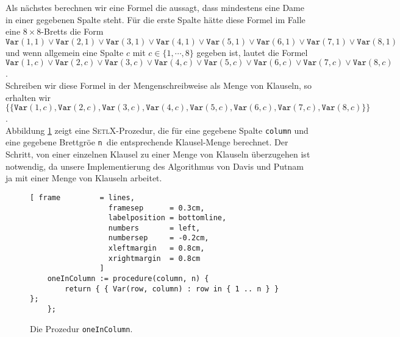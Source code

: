 Als n\"{a}chstes berechnen wir eine Formel die aussagt, dass mindestens eine Dame in einer gegebenen
Spalte steht.  F\"{u}r die erste Spalte h\"{a}tte diese Formel im Falle eine $8 \times 8$-Bretts die Form 
\\[0.2cm]
\hspace*{1.3cm}
$\texttt{Var}(1,1) \vee \texttt{Var}(2,1) \vee \texttt{Var}(3,1) \vee \texttt{Var}(4,1) \vee \texttt{Var}(5,1) \vee
\texttt{Var}(6,1) \vee \texttt{Var}(7,1) \vee \texttt{Var}(8,1)$
\\[0.2cm]
und wenn allgemein eine Spalte $c$ mit $c \in \{1,\cdots,8\}$ gegeben ist, lautet die Formel
\\[0.2cm]
\hspace*{1.3cm}
$\texttt{Var}(1,c) \vee \texttt{Var}(2,c) \vee \texttt{Var}(3,c) \vee \texttt{Var}(4,c) \vee \texttt{Var}(5,c) \vee
\texttt{Var}(6,c) \vee \texttt{Var}(7,c) \vee \texttt{Var}(8,c)$.
\\[0.2cm]
Schreiben wir diese Formel in der Mengenschreibweise als Menge von Klauseln, so erhalten wir
\\[0.2cm]
\hspace*{1.3cm}
$\bigl\{ \{\texttt{Var}(1,c) , \texttt{Var}(2,c) , \texttt{Var}(3,c) , \texttt{Var}(4,c) , \texttt{Var}(5,c) ,
\texttt{Var}(6,c) , \texttt{Var}(7,c) , \texttt{Var}(8,c) \}\bigr\}$.
\\[0.2cm]
Abbildung \ref{fig:oneInColumn} zeigt eine \textsc{SetlX}-Prozedur, die f\"{u}r eine gegebene Spalte
\texttt{column} und eine gegebene Brettgr\"{o}\3e \texttt{n }die entsprechende Klausel-Menge berechnet.
Der Schritt, von einer einzelnen Klausel 
zu einer Menge von Klauseln \"{u}berzugehen ist notwendig, da unsere Implementierung des Algorithmus von
Davis und Putnam ja mit einer Menge von Klauseln arbeitet.

\begin{figure}[!ht]
  \centering
\begin{Verbatim}[ frame         = lines, 
                  framesep      = 0.3cm, 
                  labelposition = bottomline,
                  numbers       = left,
                  numbersep     = -0.2cm,
                  xleftmargin   = 0.8cm,
                  xrightmargin  = 0.8cm
                ]
    oneInColumn := procedure(column, n) {
        return { { Var(row, column) : row in { 1 .. n } } };
    };
\end{Verbatim}
\vspace*{-0.3cm}
  \caption{Die Prozedur \texttt{oneInColumn}.}
  \label{fig:oneInColumn}
\end{figure}

